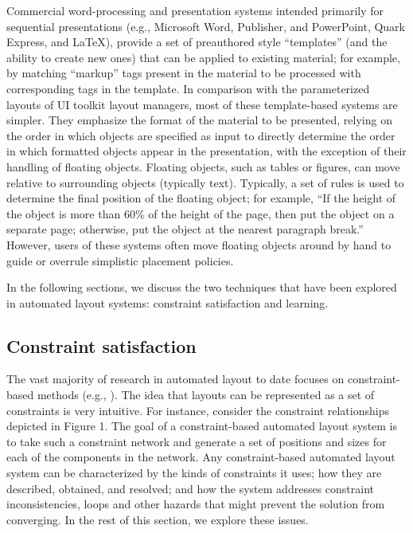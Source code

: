     Commercial word-processing and presentation systems intended primarily for
    sequential presentations (e.g., Microsoft Word, Publisher, and PowerPoint,
    Quark Express, and LaTeX), provide a set of preauthored style “templates”
    (and the ability to create new ones) that can be applied to existing
    material; for example, by matching “markup” tags present in the material to
    be processed with corresponding tags in the template. In comparison with
    the parameterized layouts of UI toolkit layout managers, most of these
    template-based systems are simpler. They emphasize the format of the
    material to be presented, relying on the order in which objects are
    specified as input to directly determine the order in which formatted
    objects appear in the presentation, with the exception of their handling of
    floating objects. Floating objects, such as tables or figures, can move
    relative to surrounding objects (typically text). Typically, a set of rules
    is used to determine the final position of the floating object; for
    example, “If the height of the object is more than 60\% of the height of
    the page, then put the object on a separate page; otherwise, put the object
    at the nearest paragraph break.” However, users of these systems often move
    floating objects around by hand to guide or overrule simplistic placement
    policies.

    In the following sections, we discuss the two techniques that have been
    explored in automated layout systems: constraint satisfaction and learning.

   \subsection{Constraint satisfaction}
    \label{constraint-satisfaction}

    The vast majority of research in automated layout to date focuses on
    constraint-based methods (e.g.,
    \citep{vanderzanden-1,borning-1,graf-1,hudson-3,kochhar-1,hudson-2,weitzman-2,myers-2}).
    The idea that layouts can be represented as a set of constraints is very
    intuitive. For instance, consider the constraint relationships depicted in
    Figure 1. The goal of a constraint-based automated layout system is to take
    such a constraint network and generate a set of positions and sizes for
    each of the components in the network. Any constraint-based automated
    layout system can be characterized by the kinds of constraints it uses; how
    they are described, obtained, and resolved; and how the system addresses
    constraint inconsistencies, loops and other hazards that might prevent the
    solution from converging. In the rest of this section, we explore these
    issues.

